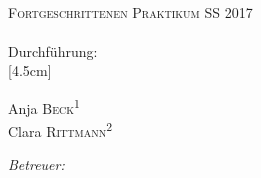 \begin{titlepage}
	\par
	\hfill
	\par
\begin{center}
\ \\
[5.5cm]	
	\textsc{\Huge Fortgeschrittenen Praktikum SS 2017} \\
[1.5cm]
	\Huge\textbf{\Versuch} \\
[1cm]
	{\large Durchführung: \Tag} \\
[4.5cm]
\begin{minipage}{0.4\textwidth}
	\begin{flushleft} \large
		Anja \textsc{Beck}\textsuperscript{1} \\
		Clara \textsc{Rittmann}\textsuperscript{2}
	\end{flushleft}
\end{minipage}
\hfill
\begin{minipage}{0.4\textwidth}
	\begin{flushright} \large
		\emph{Betreuer:} \\
		\Betreuer
	\end{flushright}
\end{minipage}
\end{center}
\end{titlepage}